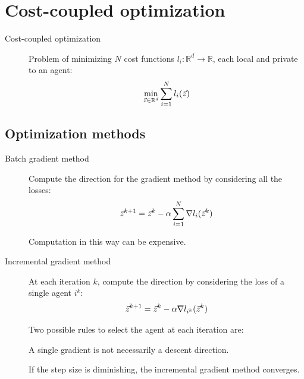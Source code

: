 \section{Cost-coupled optimization}


\begin{description}
    \item[Cost-coupled optimization] 
        Problem of minimizing $N$ cost functions $l_i: \mathbb{R}^d \rightarrow \mathbb{R}$, each local and private to an agent:
        \[
            \min_{{\vec{z}} \in \mathbb{R}^{d}} \sum_{i=1}^{N} l_i({\vec{z}})
        \]
\end{description}


\subsection{Optimization methods}

\begin{description}
    \item[Batch gradient method] 
        Compute the direction for the gradient method by considering all the losses:
        \[
            {\vec{z}}^{k+1} = {\vec{z}}^k - \alpha \sum_{i=1}^{N} \nabla l_i({\vec{z}}^k)
        \]

        \begin{remark}
            Computation in this way can be expensive.
        \end{remark}

    \item[Incremental gradient method] 
        At each iteration $k$, compute the direction by considering the loss of a single agent $i^k$:
        \[
            {\vec{z}}^{k+1} = {\vec{z}}^k - \alpha \nabla l_{i^k}({\vec{z}}^k)
        \]

        \begin{remark}
            Two possible rules to select the agent at each iteration are:
        \end{remark}

        \begin{remark}
            A single gradient is not necessarily a descent direction.
        \end{remark}

        \begin{theorem}
            If the step size is diminishing, the incremental gradient method converges.
        \end{theorem}
\end{description}


